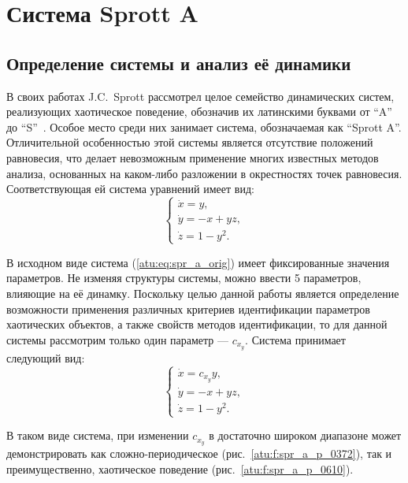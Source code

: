 
\FloatBarrier
\section{Система Sprott A}  %
\label{atu:sect:spr_a}


\subsection{Определение системы и анализ её динамики} %

В своих работах J.C.~Sprott рассмотрел целое семейство динамических
систем, реализующих хаотическое поведение, обозначив их латинскими буквами
от ``A'' до ``S''~\cite{sprott_212,sprott_strange_attr}. Особое место среди них
занимает система, обозначаемая как ``Sprott A''. Отличительной особенностью
этой системы является отсутствие положений равновесия, что делает
невозможным применение многих известных методов анализа, основанных на
каком-либо разложении в окрестностях точек равновесия. Соответствующая ей
система уравнений имеет вид:
%
\begin{equation}
  \begin{cases}
    \dot{x} =  y, \\
    \dot{y} = -x + yz, \\
    \dot{z} =  1 - y^2.
  \end{cases}
  \label{atu:eq:spr_a_orig}
\end{equation}


В исходном виде система (\ref{atu:eq:spr_a_orig}) имеет фиксированные значения параметров.
Не изменяя структуры системы, можно ввести 5 параметров, влияющие на её динамку.
Поскольку целью данной работы является определение возможности применения
различных критериев идентификации параметров
хаотических объектов, а также свойств методов идентификации, то для данной системы
рассмотрим только один параметр --- $c_{x_y} $. Система принимает следующий вид:
%
\begin{equation}
  \begin{cases}
    \dot{x} =  c_{x_y} y, \\
    \dot{y} = -x + yz, \\
    \dot{z} =  1 - y^2.
  \end{cases}
  \label{atu:eq:spr_a}
\end{equation}

В таком виде система, при изменении $c_{x_y} $
в достаточно широком диапазоне может демонстрировать как
сложно-периодическое (рис.~\ref{atu:f:spr_a_p_0372}), так и преимущественно, хаотическое
поведение (рис.~\ref{atu:f:spr_a_p_0610}).

